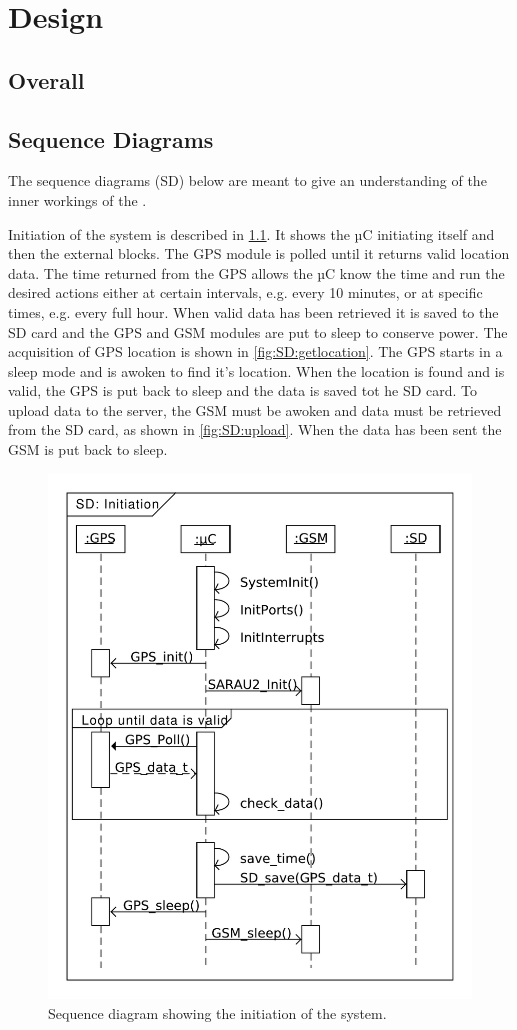 
\chapter{Design}
\label{ch:Design}

\section{Overall}
\section{Sequence Diagrams}
The sequence diagrams (SD) below are meant to give an understanding of the inner workings of the \systemName.

Initiation of the system is described in \cref{fig:SD:init}.
It shows the µC initiating itself and then the external blocks.
The GPS module is polled until it returns valid location data. The time returned from the GPS allows the µC know the time and run the desired actions either at certain intervals, e.g. every 10 minutes, or at specific times, e.g. every full hour.
When valid data has been retrieved it is saved to the SD card and the GPS and GSM modules are put to sleep to conserve power.
The acquisition of GPS location is shown in \cref{fig:SD:getlocation}.
The GPS starts in a sleep mode and is awoken to find it's location.
When the location is found and is valid, the GPS is put back to sleep and the data is saved tot he SD card.
To upload data to the server, the GSM must be awoken and data must be retrieved from the SD card, as shown in \cref{fig:SD:upload}.
When the data has been sent the GSM is put back to sleep.

\begin{figure}
	\centering
	\includegraphics[width=0.7\linewidth]{gfx/Design/SD_init.pdf}
	\caption{Sequence diagram showing the initiation of the system.}
	\label{fig:SD:init}
\end{figure}

